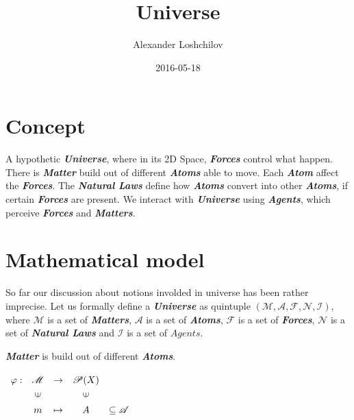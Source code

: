 \documentclass[a4paper]{article}
\title{Universe}
\author{Alexander Loshchilov}
\date{2016-05-18}
\begin{document}
\maketitle

\newpage

\section{Concept}

A hypothetic \textit{\textbf{Universe}}, where in its 2D Space, \textit{\textbf{Forces}} control what happen. There is \textit{\textbf{Matter}} build out of different \textit{\textbf{Atoms}} able to move. Each \textit{\textbf{Atom}} affect the \textit{\textbf{Forces}}. The \textit{\textbf{Natural Laws}} define how \textit{\textbf{Atoms}} convert into other \textit{\textbf{Atoms}}, if certain \textit{\textbf{Forces}} are present. We interact with \textit{\textbf{Universe}} using \textit{\textbf{Agents}}, which perceive \textit{\textbf{Forces}} and \textit{\textbf{Matters}}.

\newpage

\section{Mathematical model}

So far our discussion about notions involded in universe has been rather imprecise.
Let us formally define a \textit{\textbf{Universe}} as quintuple
$ (\mathscr{M}, \mathscr{A}, \mathscr{F}, \mathscr{N}, \mathscr{I}) $,
where $ \mathscr{M} $ is a set of \textit{\textbf{Matters}}, $ \mathscr{A} $ is a set of \textit{\textbf{Atoms}},
$ \mathscr{F} $ is a set of \textit{\textbf{Forces}}, $ \mathscr{N} $ is a set of \textit{\textbf{Natural Laws}} and
$ \mathscr{I} $ is a set of $ Agents $.

\textit{\textbf{Matter}} is build out of different \textit{\textbf{Atoms}}.


$\renewcommand{\arraystretch}{1.3}
\begin{array}[c]{ccccc}
\varphi:&\mathscr{M}&\rightarrow&\mathscr{P}(X)\\
&\rotatebox{90}{$\in$}&&\rotatebox{90}{$\in$}&\\
&m&\mapsto& A &\subseteq \mathscr{A}
\end{array}$
\end{document}
